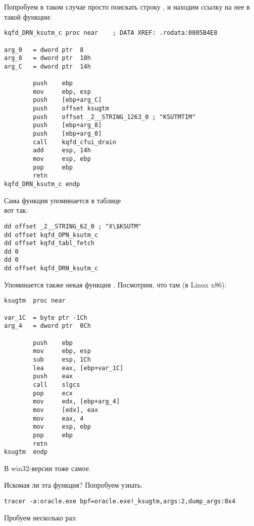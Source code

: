 Попробуем в таком случае просто поискать строку , и находим ссылку на нее в такой функции:

\begin{lstlisting}[style=customasmx86]
kqfd_DRN_ksutm_c proc near    ; DATA XREF: .rodata:0805B4E8

arg_0   = dword ptr  8
arg_8   = dword ptr  10h
arg_C   = dword ptr  14h

        push    ebp
        mov     ebp, esp
        push    [ebp+arg_C]
        push    offset ksugtm
        push    offset _2__STRING_1263_0 ; "KSUTMTIM"
        push    [ebp+arg_8]
        push    [ebp+arg_0]
        call    kqfd_cfui_drain
        add     esp, 14h
        mov     esp, ebp
        pop     ebp
        retn
kqfd_DRN_ksutm_c endp
\end{lstlisting}

Сама функция  упоминается в таблице \\
 вот так:

\begin{lstlisting}[style=customasmx86]
dd offset _2__STRING_62_0 ; "X\$KSUTM"
dd offset kqfd_OPN_ksutm_c
dd offset kqfd_tabl_fetch
dd 0
dd 0
dd offset kqfd_DRN_ksutm_c
\end{lstlisting}

Упоминается также некая функция .
Посмотрим, что там (в Linux x86):

\begin{lstlisting}[caption=ksu.o,style=customasmx86]
ksugtm  proc near

var_1C  = byte ptr -1Ch
arg_4   = dword ptr  0Ch

        push    ebp
        mov     ebp, esp
        sub     esp, 1Ch
        lea     eax, [ebp+var_1C]
        push    eax
        call    slgcs
        pop     ecx
        mov     edx, [ebp+arg_4]
        mov     [edx], eax
        mov     eax, 4
        mov     esp, ebp
        pop     ebp
        retn
ksugtm  endp
\end{lstlisting}

В win32-версии тоже самое.

Искомая ли эта функция? Попробуем узнать:

\begin{lstlisting}
tracer -a:oracle.exe bpf=oracle.exe!_ksugtm,args:2,dump_args:0x4
\end{lstlisting}

Пробуем несколько раз:

